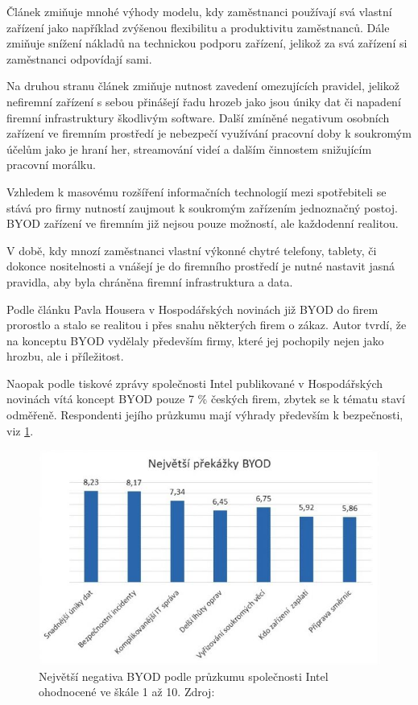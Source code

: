 Článek  zmiňuje mnohé výhody modelu, kdy zaměstnanci používají svá vlastní zařízení jako například zvýšenou flexibilitu a produktivitu zaměstnanců. Dále zmiňuje snížení nákladů na technickou podporu zařízení, jelikož za svá zařízení si zaměstnanci odpovídají sami.

Na druhou stranu článek zmiňuje nutnost zavedení omezujících pravidel, jelikož nefiremní zařízení s sebou přinášejí řadu hrozeb jako jsou úniky dat či napadení firemní infrastruktury škodlivým software.  Další zmíněné negativum osobních zařízení ve firemním prostředí je nebezpečí využívání pracovní doby k soukromým účelům jako je hraní her, streamování videí a dalším činnostem snižujícím pracovní morálku.

Vzhledem k masovému rozšíření informačních technologií mezi spotřebiteli se stává pro firmy nutností zaujmout k soukromým zařízením jednoznačný postoj. BYOD zařízení ve firemním již nejsou pouze možností, ale každodenní realitou.

V době, kdy mnozí zaměstnanci vlastní výkonné chytré telefony, tablety, či dokonce nositelnosti a vnášejí je do firemního prostředí je nutné nastavit jasná pravidla, aby byla chráněna firemní infrastruktura a data.

Podle článku Pavla Housera v Hospodářských novinách  již BYOD do firem prorostlo a stalo se realitou i přes snahu některých firem o zákaz. Autor tvrdí, že na konceptu BYOD vydělaly především firmy, které jej pochopily nejen jako hrozbu, ale i příležitost. 

Naopak podle tiskové zprávy společnosti Intel publikované v Hospodářských novinách  vítá koncept BYOD pouze 7 \% českých firem, zbytek se k tématu staví odměřeně. Respondenti jejího průzkumu mají výhrady především k bezpečnosti, viz \ref{intelBYOD}.

\begin{figure}[h!]\label{intelBYOD}
\centering
\includegraphics[width=12cm]{img/intelBYOD}
\caption{Největší negativa BYOD podle průzkumu společnosti Intel ohodnocené ve škále 1 až 10. Zdroj: } 
\end{figure}

